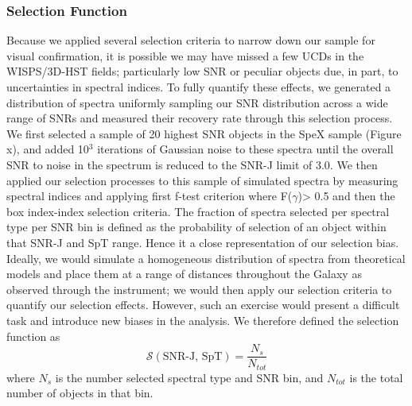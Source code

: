 \documentclass[manuscript]{aastex}
\begin{document}
\subsubsection{Selection Function}\label{selectionf}
Because we applied several selection criteria to narrow down our sample for visual confirmation, it is possible we may have missed a few UCDs in the WISPS/3D-HST fields; particularly low SNR or peculiar objects due, in part, to uncertainties in spectral indices. To fully quantify these effects, we generated a distribution of spectra uniformly sampling our SNR distribution across a wide range of SNRs and measured their recovery rate through this selection process. We first selected a sample of 20 highest SNR objects in the SpeX sample (Figure x), and added 10$^3$ iterations of Gaussian noise to these spectra until the overall SNR to noise in the spectrum is reduced to the SNR-J limit of 3.0. We then applied our selection processes to this sample of simulated spectra by measuring spectral indices and applying first f-test criterion where F($\gamma$)> 0.5 and then the box index-index selection criteria. The fraction of spectra selected per spectral type per SNR bin is defined as the probability of selection of an object within that SNR-J and SpT range. Hence it a close representation of our selection bias. Ideally, we would simulate a homogeneous distribution of spectra from theoretical models and place them at a range of distances throughout the Galaxy as observed  through the instrument; we would then apply our selection criteria to quantify our selection effects. However, such an exercise would present a difficult task and introduce new biases in the analysis. We therefore defined the selection function as 
\begin{equation*}
\mathcal{S}(\text{SNR-J, SpT})= \frac{N_s}{N_{tot}}
\end{equation*} where $N_s$ is the number selected spectral type and SNR bin, and $N_{tot}$ is the total number of objects in that bin.
\end{document}
